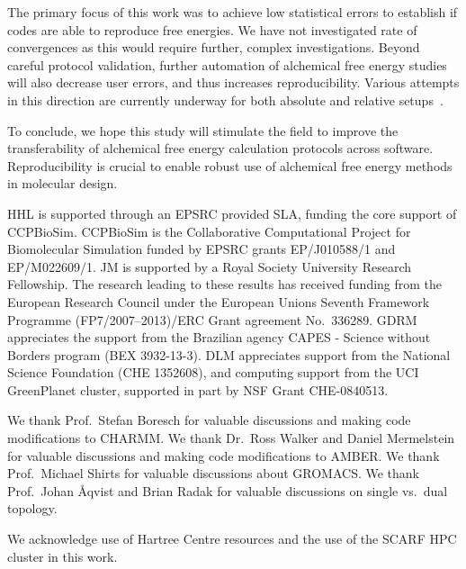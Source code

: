 \documentclass[journal=jctcce,manuscript=article]{achemso}
\begin{document}
The primary focus of this work was to achieve low statistical errors to establish if codes are able to reproduce free energies.  We have not investigated rate of convergences as this would require further, complex investigations.  Beyond careful protocol validation,  further automation of alchemical free energy studies will also decrease user errors, and thus increases  reproducibility.  Various attempts in 
this direction are currently underway for both absolute and relative 
setups~\cite{christ_accuracy_2013, JCC:JCC23804, Liu2013, 
doi:10.1021/jp505332p, doi:10.1021/acs.jcim.6b00162, 
doi:10.1021/acs.jctc.6b00979,loeffler_fesetup:_2015}.

To conclude, we hope this study will stimulate the field to improve the transferability of alchemical free energy calculation protocols across software.  Reproducibility is crucial to enable robust use of alchemical free energy methods in molecular design. 




\begin{acknowledgement}
  HHL is supported through an EPSRC provided SLA, funding the core
  support of CCPBioSim.  CCPBioSim is the Collaborative Computational
  Project for Biomolecular Simulation funded by EPSRC grants
  EP/J010588/1 and EP/M022609/1.  JM is supported by a Royal Society
  University Research Fellowship.  The research leading to these
  results has received funding from the European Research Council
  under the European Unions Seventh Framework Programme
  (FP7/2007--2013)/ERC Grant agreement No.\ 336289.  GDRM appreciates
  the support from the Brazilian agency CAPES - Science without
  Borders program (BEX 3932-13-3).  DLM appreciates support from the
  National Science Foundation (CHE 1352608), and computing support
  from the UCI GreenPlanet cluster, supported in part by NSF Grant
  CHE-0840513.

  We thank Prof.\ Stefan Boresch for valuable discussions and making code
  modifications to CHARMM.  We thank Dr.\ Ross Walker and Daniel Mermelstein
  for valuable discussions and making code modifications to AMBER.  We thank
  Prof.\ Michael Shirts for valuable discussions about GROMACS.  We thank
  Prof.\ Johan \AA{}qvist and Brian Radak for valuable discussions on single
  vs.\ dual topology.

  We acknowledge use of Hartree Centre resources and the use of the
  SCARF HPC cluster in this work.
\end{acknowledgement}



\end{document}
